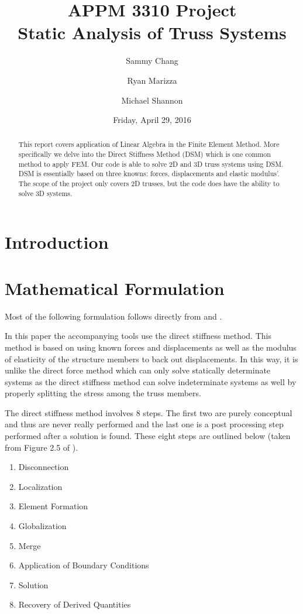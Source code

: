 \documentclass{article}
\title{APPM 3310 Project\\\Large{Static Analysis of Truss Systems}}
\author{Sammy Chang\and{}Ryan Marizza\and{}Michael Shannon}
\date{Friday, April 29, 2016}
\begin{document}
\maketitle


\begin{abstract}
This report covers application of Linear Algebra in the Finite Element Method.
More specifically we delve into the Direct Stiffness Method (DSM) which is one
common method to apply FEM. Our code is able to solve 2D and 3D truss systems
using DSM. DSM is essentially based on three knowns: forces, displacements and
elastic modulus'. The scope of the project only covers 2D trusses, but the
code does have the ability to solve 3D systems.
\end{abstract}


\section{Introduction}




\section{Mathematical Formulation}

Most of the following formulation follows directly from
\parencite{felippa2004ch2} and \parencite{felippa2004ch3}.

In this paper the accompanying tools use the direct stiffness method.  This
method is based on using known forces and displacements as well as the modulus
of elasticity of the structure members to back out displacements.  In this
way, it is unlike the direct force method which can only solve statically
determinate systems as the direct stiffness method can solve indeterminate
systems as well by properly splitting the stress among the truss members.

The direct stiffness method involves 8 steps.  The first two are purely
conceptual and thus are never really performed and the last one is a post
processing step performed after a solution is found.  These eight steps are
outlined below (taken from Figure 2.5 of \cite{felippa2004ch2}).
\begin{enumerate}[noitemsep]
    \item Disconnection
    \item Localization
    \item Element Formation
    \item Globalization
    \item Merge
    \item Application of Boundary Conditions
    \item Solution
    \item Recovery of Derived Quantities
\end{enumerate}
\end{document}
